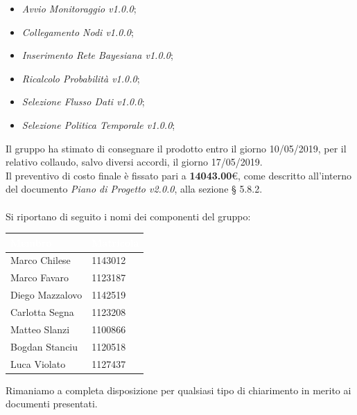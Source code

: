 \documentclass[11pt, a4paper]{letter} %
\begin{document}
\begin{letter}
\begin{itemize}
\begin{itemize}
			\item \textit{Avvio Monitoraggio v1.0.0};
			\item \textit{Collegamento Nodi v1.0.0};
			\item \textit{Inserimento Rete Bayesiana v1.0.0};
			\item \textit{Ricalcolo Probabilità v1.0.0};
			\item \textit{Selezione Flusso Dati v1.0.0};
			\item \textit{Selezione Politica Temporale v1.0.0};
		\end{itemize}
		\end{itemize}
		Il gruppo ha stimato di consegnare il prodotto entro il giorno 10/05/2019, per il relativo collaudo, salvo diversi accordi, il giorno 17/05/2019.\\  
		Il preventivo di costo finale è fissato pari a \textbf{14043.00}€, come descritto all'interno del documento \textit{Piano di Progetto v2.0.0}, alla sezione § 5.8.2.\\ %
		\-\\
		Si riportano di seguito i nomi dei componenti del gruppo:
		\begin{center}
			\begin{longtable}[c]{|m{}m{}|} 
				\hline
				\rowcolor{bluelogo}\textbf{\textcolor{white}{Membro}}  & \textbf{\textcolor{white}{Matricola}}\\
				\hline
				Marco Chilese & 1143012\\
				\hline
				\rowcolor{grigio}Marco Favaro & 1123187\\ 
				\hline
				Diego Mazzalovo & 1142519\\
				\hline
				\rowcolor{grigio}Carlotta Segna & 1123208\\
				\hline
				Matteo Slanzi & 1100866\\
				\hline
				\rowcolor{grigio}Bogdan Stanciu  & 1120518\\
				\hline
				Luca Violato & 1127437\\
				\hline
			\end{longtable}
		\end{center}
		
		Rimaniamo a completa disposizione per qualsiasi tipo di chiarimento in merito ai documenti presentati.
		

\end{letter}
\end{document}
